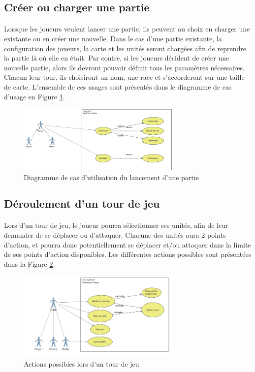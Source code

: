 \subsection{Créer ou charger une partie}

\paragraph{}
Lorsque les joueurs veulent lancer une partie, ils peuvent au choix en charger une existante ou en créer une nouvelle. Dans le cas d'une partie existante, la configuration des joueurs, la carte et les unités seront chargées afin de reprendre la partie là où elle en était. Par contre, si les joueurs décident de créer une nouvelle partie, alors ils devront pouvoir définir tous les paramètres nécessaires. Chacun leur tour, ils choisiront un nom, une race et s'accorderont sur une taille de carte. L'ensemble de ces usages sont présentés dans le diagramme de cas d'usage en Figure \ref{uc_game_creation}.

\begin{figure}[h]
  \centering
  \includegraphics[width=8cm]{schemas/uc_game_creation.png}
  \caption{Diagramme de cas d'utilisation du lancement d'une partie}
  \label{uc_game_creation}
\end{figure}


\subsection{Déroulement d'un tour de jeu}

\paragraph{}
Lors d'un tour de jeu, le joueur pourra sélectionner ses unités, afin de leur demander de se déplacer ou d'attaquer. Chacune des unités aura 2 points d'action, et pourra donc potentiellement se déplacer et/ou attaquer dans la limite de ses points d'action disponibles. Les différentes actions possibles sont présentées dans la Figure \ref{uc_game_round}.

\begin{figure}[h]
  \centering
  \includegraphics[width=8cm]{schemas/uc_game_round.png}
  \caption{Actions possibles lors d'un tour de jeu}
  \label{uc_game_round}
\end{figure}


